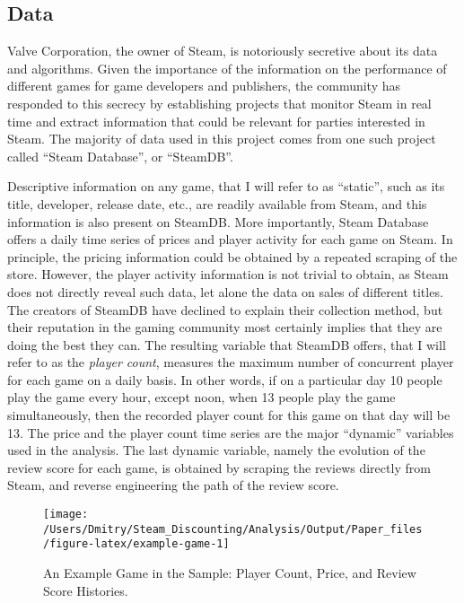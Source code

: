 \documentclass[12pt,pagebackref]{article}
\begin{document}
\hypertarget{data}{%
\subsection{Data}\label{data}}

Valve Corporation, the owner of Steam, is notoriously secretive about
its data and algorithms. Given the importance of the information on the
performance of different games for game developers and publishers, the
community has responded to this secrecy by establishing projects that
monitor Steam in real time and extract information that could be
relevant for parties interested in Steam. The majority of data used in
this project comes from one such project called ``Steam Database'', or
``SteamDB''.

Descriptive information on any game, that I will refer to as ``static'',
such as its title, developer, release date, etc., are readily available
from Steam, and this information is also present on SteamDB. More
importantly, Steam Database offers a daily time series of prices and
player activity for each game on Steam. In principle, the pricing
information could be obtained by a repeated scraping of the store.
However, the player activity information is not trivial to obtain, as
Steam does not directly reveal such data, let alone the data on sales of
different titles. The creators of SteamDB have declined to explain their
collection method, but their reputation in the gaming community most
certainly implies that they are doing the best they can. The resulting
variable that SteamDB offers, that I will refer to as the \emph{player
count}, measures the maximum number of concurrent player for each game
on a daily basis. In other words, if on a particular day 10 people play
the game every hour, except noon, when 13 people play the game
simultaneously, then the recorded player count for this game on that day
will be 13. The price and the player count time series are the major
``dynamic'' variables used in the analysis. The last dynamic variable,
namely the evolution of the review score for each game, is obtained by
scraping the reviews directly from Steam, and reverse engineering the
path of the review score.

\begin{figure}[h]

{\centering \texttt{[image: /Users/Dmitry/Steam\_Discounting/Analysis/Output/Paper\_files/figure-latex/example-game-1]} 

}

\caption{\label{exampleGame} An Example Game in the Sample: Player Count, Price, and Review Score Histories.}\label{fig:example-game}
\end{figure}
\end{document}
